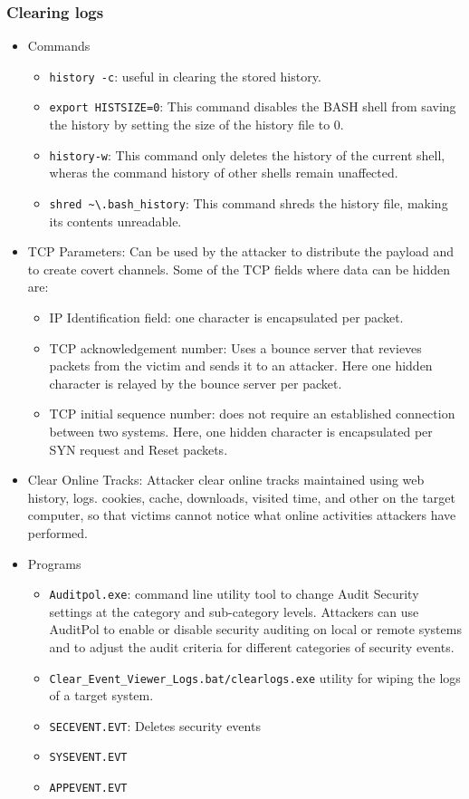 \subsubsection{Clearing logs}
\begin{itemize}
    \item Commands
    \begin{itemize}
        \item \verb|history -c|: useful in clearing the stored history.
        \item \verb|export HISTSIZE=0|: This command disables the BASH shell from saving the history by setting the size of the history file to 0.
        \item \verb|history-w|: This command only deletes the history of the current shell, wheras the command history of other shells remain unaffected.
        \item \verb|shred ~\.bash_history|: This command shreds the history file, making its contents unreadable.
    \end{itemize}
    \item TCP Parameters: Can be used by the attacker to distribute the payload and to create covert channels. Some of the TCP fields where data can be hidden are:
    \begin{itemize}
        \item IP Identification field: one character is encapsulated per packet.
        \item TCP acknowledgement number: Uses a bounce server that revieves packets from the victim and sends it to an attacker. Here one hidden character is relayed by the bounce server per packet.
        \item TCP initial sequence number: does not require an established connection between two systems. Here, one hidden character is encapsulated per SYN request and Reset packets.
    \end{itemize}
    \item Clear Online Tracks: Attacker clear online tracks maintained using web history, logs. cookies, cache, downloads, visited time, and other on the target computer, so that victims cannot notice what online activities attackers have performed.
    \item Programs
    \begin{itemize}
        \item \verb|Auditpol.exe|: command line utility tool to change Audit Security settings at the category and sub-category levels. Attackers can use AuditPol to enable or disable security auditing on local or remote systems and to adjust the audit criteria for different categories of security events.
        \item \verb|Clear_Event_Viewer_Logs.bat/clearlogs.exe| utility for wiping the logs of a target system.
        \item \verb|SECEVENT.EVT|: Deletes security events
        \item \verb|SYSEVENT.EVT|
        \item \verb|APPEVENT.EVT|
    \end{itemize}
\end{itemize}

